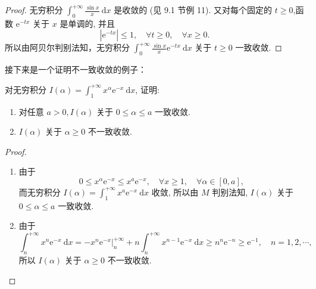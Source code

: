 \begin{proof}
    无穷积分 $\int_0^{+\infty} \frac{\sin x}{x} \mathrm{~d} x$ 是收敛的 (见 9.1 节例 11). 又对每个固定的 $t \geqslant 0$,函数 $\mathrm{e}^{-t x}$ 关于 $x$ 是单调的, 并且
    \[
    \left|\mathrm{e}^{-t x}\right| \leqslant 1, \quad \forall t \geqslant 0, \quad \forall x \geqslant 0 .
    \]
    所以由阿贝尔判别法知，无穷积分 $\int_0^{+\infty} \frac{\sin x}{x} \mathrm{e}^{-t x} \mathrm{~d} x$ 关于 $t \geqslant 0$ 一致收敛.
\end{proof}

接下来是一个证明不一致收敛的例子：
\begin{example}
    对无穷积分 $I(\alpha)=\int_1^{+\infty} x^\alpha \mathrm{e}^{-x} \mathrm{~d} x$, 证明:
\begin{enumerate}
    \item 对任意 $a>0, I(\alpha)$ 关于 $0 \leqslant \alpha \leqslant a$ 一致收敛.
    \item $I(\alpha)$ 关于 $\alpha \geqslant 0$ 不一致收敛.
\end{enumerate}
\end{example}
\begin{proof}
    \begin{enumerate}
        \item 由于
        \[
        0 \leqslant x^\alpha \mathrm{e}^{-x} \leqslant x^a \mathrm{e}^{-x}, \quad \forall x \geqslant 1, \quad \forall \alpha \in[0, a],
        \]
        而无穷积分 $I(\alpha)=\int_1^{+\infty} x^a \mathrm{e}^{-x} \mathrm{~d} x$ 收敛, 所以由 $M$ 判别法知, $I(\alpha)$ 关于 $0 \leqslant \alpha \leqslant a$ 一致收敛.
        \item 由于
        \[
        \int_n^{+\infty} x^n \mathrm{e}^{-x} \mathrm{~d} x=-\left.x^n \mathrm{e}^{-x}\right|_n ^{+\infty}+n \int_n^{+\infty} x^{n-1} \mathrm{e}^{-x} \mathrm{~d} x \geqslant n^n \mathrm{e}^{-n} \geqslant \mathrm{e}^{-1}, \quad n=1,2, \cdots,
        \]
        所以 $I(\alpha)$ 关于 $\alpha \geqslant 0$ 不一致收敛.
\end{enumerate}
\end{proof}
